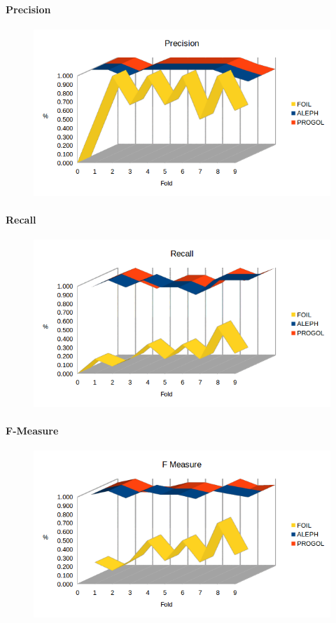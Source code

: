 \paragraph{Precision}
\begin{figure}[H]
	\includegraphics[width=1.1\textwidth]{img/datasetGraph/mlj/nodiscr/precision.png}
	\label{mljnodiscr-Precision}
\end{figure}
\paragraph{Recall}
\begin{figure}[H]
	\includegraphics[width=1.1\textwidth]{img/datasetGraph/mlj/nodiscr/recall.png}
	\label{mljnodiscr-Recall}
\end{figure}
\paragraph{F-Measure}
\begin{figure}[H]
	\includegraphics[width=1.1\textwidth]{img/datasetGraph/mlj/nodiscr/fm.png}
	\label{mljnodiscr-F-measure}
\end{figure}
